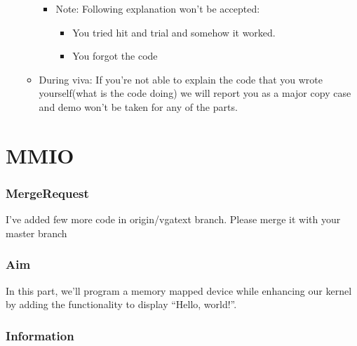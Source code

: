 \documentclass[]{book}
\newenvironment{Shaded}{}{}
\newcommand{\KeywordTok}[1]{\textbf{{#1}}}
\newcommand{\NormalTok}[1]{{#1}}
\begin{document}
\begin{itemize}
\begin{itemize}
    \begin{itemize}
    \itemsep1pt\parskip0pt
    \item
      Note: Following explanation won't be accepted:

      \begin{itemize}
      \itemsep1pt\parskip0pt
      \item
        You tried hit and trial and somehow it worked.
      \item
        You forgot the code
      \end{itemize}
    \end{itemize}
  \item
    During viva: If you're not able to explain the code that you wrote
    yourself(what is the code doing) we will report you as a major copy
    case and demo won't be taken for any of the parts.
  \end{itemize}
\end{itemize}

\section{MMIO}\label{mmio}

\subsubsection*{MergeRequest}\label{mergerequest}

I've added few more code in origin/vgatext branch. Please merge it with
your master branch

\begin{Shaded}
\end{Shaded}

\subsubsection*{Aim}\label{aim}

In this part, we'll program a memory mapped device while enhancing our
kernel by adding the functionality to display ``Hello, world!''.

\subsubsection*{Information}\label{information}
\end{document}
